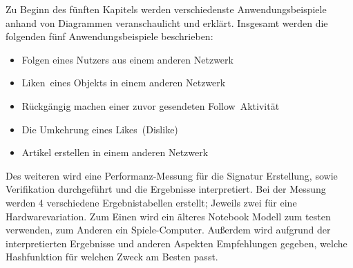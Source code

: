 	Zu Beginn des fünften Kapitels werden verschiedenste Anwendungsbeispiele anhand von Diagrammen veranschaulicht und erklärt. Insgesamt werden die folgenden fünf Anwendungsbeispiele beschrieben:
	\begin{itemize}
		\item Folgen eines Nutzers aus einem anderen Netzwerk
		\item \glqq Liken\grqq~eines Objekts in einem anderen Netzwerk
		\item Rückgängig machen einer zuvor gesendeten \glqq Follow\grqq~Aktivität
		\item Die Umkehrung eines \glqq Likes\grqq~(Dislike)
		\item Artikel erstellen in einem anderen Netzwerk
	\end{itemize}
	Des weiteren wird eine Performanz-Messung für die Signatur Erstellung, sowie Verifikation durchgeführt und die Ergebnisse interpretiert. Bei der Messung werden 4 verschiedene Ergebnistabellen erstellt; Jeweils zwei für eine Hardwarevariation. Zum Einen wird ein älteres Notebook Modell zum testen verwenden, zum Anderen ein Spiele-Computer. Außerdem wird aufgrund der interpretierten Ergebnisse und anderen Aspekten Empfehlungen gegeben, welche Hashfunktion für welchen Zweck am Besten passt.